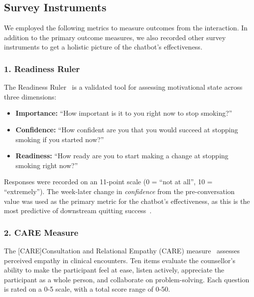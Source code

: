 \subsection{Survey Instruments}
\label{subsec:survey-instruments}

We employed the following metrics to measure outcomes from the interaction. In addition to the primary outcome measures, we also recorded other survey instruments to get a holistic picture of the chatbot's effectiveness.

\subsubsection{1. Readiness Ruler}
\label{subsec:readiness-ruler}
The Readiness Ruler~\citep{rollnick1992development} is a validated tool for assessing motivational state across three dimensions:
\begin{itemize}
    \item \textbf{Importance:} ``How important is it to you right now to stop smoking?''
    \item \textbf{Confidence:} ``How confident are you that you would succeed at stopping smoking if you started now?''
    \item \textbf{Readiness:} ``How ready are you to start making a change at stopping smoking right now?''
\end{itemize}
Responses were recorded on an 11-point scale (0 = ``not at all'', 10 = ``extremely''). The week-later change in \emph{confidence} from the pre-conversation value was used as the primary metric for the chatbot's effectiveness, as this is the most predictive
of downstream quitting success~\cite{Gwaltney2009-wj,Abar2013}.

\subsubsection{2. CARE Measure}
\label{subsec:care}
The [CARE]Consultation and Relational Empathy (CARE) measure~\citep{mercer2004consultation,bikker2015measuring} assesses perceived empathy in clinical encounters. Ten items evaluate the counsellor's ability to make the participant feel at ease, listen actively, appreciate the participant as a whole person, and collaborate on problem-solving. Each question is rated on a 0-5 scale, with a total score range of 0-50.

